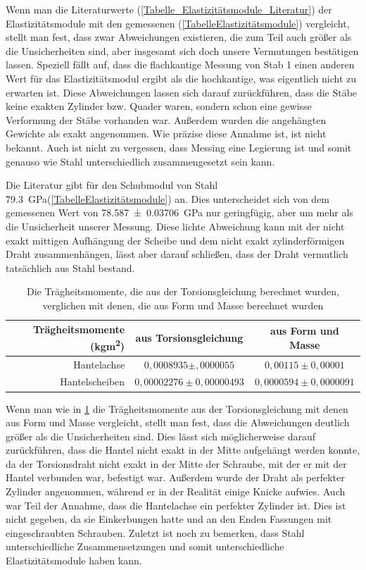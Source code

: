 \documentclass[
	a4paper,
	12pt,
	pagesize,
	ngerman
]{scrartcl}
\begin{document}
	Wenn man die Literaturwerte (\cref{Tabelle_Elastizitätsmodule_Literatur}) der Elastizitätsmodule mit den gemessenen (\cref{TabelleElastizitätsmodule}) vergleicht, stellt man fest, dass zwar Abweichungen existieren, die zum Teil auch größer als die Unsicherheiten sind, aber insgesamt sich doch unsere Vermutungen bestätigen lassen. Speziell fällt auf, dass die flachkantige Messung von Stab 1 einen anderen Wert für das Elastizitätsmodul ergibt als die hochkantige, was eigentlich nicht zu erwarten ist. Diese Abweichungen lassen sich darauf zurückführen, dass die Stäbe keine exakten Zylinder bzw. Quader waren, sondern schon eine gewisse Verformung der Stäbe vorhanden war. Außerdem wurden die angehängten Gewichte als exakt angenommen. Wie präzise diese Annahme ist, ist nicht bekannt. Auch ist nicht zu vergessen, dass Messing eine Legierung ist und somit genauso wie Stahl unterschiedlich zusammengesetzt sein kann. %
	\\
	\par
	Die Literatur gibt für den Schubmodul von Stahl \SI{79,3}{\giga \pascal}(\cref{TabelleElastizitätsmodule}) an. Dies unterscheidet sich von dem gemessenen Wert von \SI{78,587\pm 0,03706}{\giga \pascal} nur geringfügig, aber um mehr als die Unsicherheit unserer Messung. Diese lichte Abweichung kann mit der nicht exakt mittigen Aufhängung der Scheibe und dem nicht exakt zylinderförmigen Draht zusammenhängen, lässt aber darauf schließen, dass der Draht vermutlich tatsächlich aus Stahl bestand.
	\par
	\begin{table}[tb]
		\centering
		\begin{tabular}{ r | c | c |}
			Trägheitsmomente (\si{kgm^2})& aus Torsionsgleichung & aus Form und Masse\\ \hline
			Hantelachse & $0,0008935 \pm ,0000055$ &$ 0,00115 \pm0,00001$\\
			Hantelscheiben & $0,00002276 \pm 0,00000493$ & $0,0000594\pm 0,0000091$\\ \hline
		\end{tabular}
		\caption{Die Trägheitsmomente, die aus der Torsionsgleichung berechnet wurden, verglichen mit denen, die aus Form und Masse berechnet wurden}
		\label{Trägheitsmomente_Vergleich} 
	\end{table}
	
	Wenn man wie in \cref{Trägheitsmomente_Vergleich} die Trägheitsmomente aus der Torsionsgleichung mit denen aus Form und Masse vergleicht, stellt man fest, dass die Abweichungen deutlich größer als die Unsicherheiten sind.
	Dies lässt sich möglicherweise darauf zurückführen, dass die Hantel nicht exakt in der Mitte aufgehängt werden konnte, da der Torsionsdraht nicht exakt in der Mitte der Schraube, mit der er mit der Hantel verbunden war, befestigt war.
	Außerdem wurde der Draht als perfekter Zylinder angenommen, während er in der Realität einige Knicke aufwies.
	Auch war Teil der Annahme, dass die Hantelachse ein perfekter Zylinder ist.
	Dies ist nicht gegeben, da sie Einkerbungen hatte und an den Enden Fassungen mit eingeschraubten Schrauben.
	Zuletzt ist noch zu bemerken, dass Stahl unterschiedliche Zusammensetzungen und somit unterschiedliche  Elastizitätsmodule haben kann.
	
\end{document}
